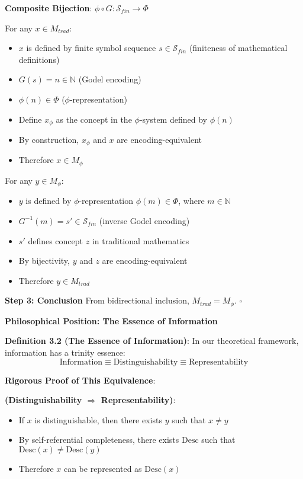 \textbf{Composite Bijection}: $\phi \circ G: \mathcal{S}_{fin} \to \Phi$

For any $x \in M_{trad}$:
\begin{itemize}
\item $x$ is defined by finite symbol sequence $s \in \mathcal{S}_{fin}$ (finiteness of mathematical definitions)
\item $G(s) = n \in \mathbb{N}$ (Godel encoding)
\item $\phi(n) \in \Phi$ ($\phi$-representation)
\item Define $x_\phi$ as the concept in the $\phi$-system defined by $\phi(n)$
\item By construction, $x_\phi$ and $x$ are encoding-equivalent
\item Therefore $x \in M_\phi$
\end{itemize}

For any $y \in M_\phi$:
\begin{itemize}
\item $y$ is defined by $\phi$-representation $\phi(m) \in \Phi$, where $m \in \mathbb{N}$
\item $G^{-1}(m) = s' \in \mathcal{S}_{fin}$ (inverse Godel encoding)
\item $s'$ defines concept $z$ in traditional mathematics
\item By bijectivity, $y$ and $z$ are encoding-equivalent
\item Therefore $y \in M_{trad}$
\end{itemize}

\textbf{Step 3: Conclusion}
From bidirectional inclusion, $M_{trad} = M_\phi$. $\square$

\textbf{Philosophical Position: The Essence of Information}

\textbf{Definition 3.2 (The Essence of Information)}:
\label{thm:1.4}
In our theoretical framework, information has a trinity essence:
\begin{equation}
\text{Information} \equiv \text{Distinguishability} \equiv \text{Representability}
\end{equation}

\textbf{Rigorous Proof of This Equivalence}:

\textbf{(Distinguishability $\Rightarrow$ Representability)}:
\begin{itemize}
\item If $x$ is distinguishable, then there exists $y$ such that $x \neq y$
\item By self-referential completeness, there exists $\text{Desc}$ such that $\text{Desc}(x) \neq \text{Desc}(y)$
\item Therefore $x$ can be represented as $\text{Desc}(x)$
\end{itemize}

